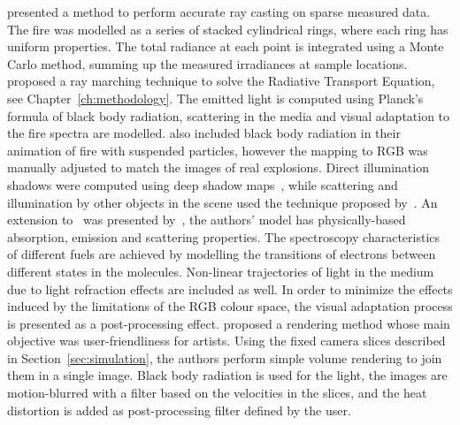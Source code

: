 \cite{Rushmeier:1995} presented a method to perform accurate ray casting on sparse measured data.
The fire was modelled as a series of stacked cylindrical rings, where each ring has uniform properties.
The total radiance at each point is integrated using a Monte Carlo method, summing up the measured irradiances at sample locations. 
\cite{Nguyen:2002} proposed a ray marching technique to solve the Radiative Transport Equation, see Chapter~\ref{ch:methodology}.
The emitted light is computed using Planck's formula of black body radiation, scattering in the media and visual adaptation to the fire spectra are modelled.
\cite{Feldman:2003} also included black body radiation in their animation of fire with suspended particles, however the mapping to RGB was manually adjusted to match the images of real explosions.
Direct illumination shadows were computed using deep shadow maps~\cite{Lokovic:2000}, while scattering and illumination by other objects in the scene used the technique proposed by~\cite{Jensen:2002}.
An extension to~\cite{Nguyen:2002} was presented by~\cite{Pegoraro:2006}, the authors' model has physically-based absorption, emission and scattering properties.
The spectroscopy characteristics of different fuels are achieved by modelling the transitions of electrons between different states in the molecules.
Non-linear trajectories of light in the medium due to light refraction effects are included as well.
In order to minimize the effects induced by the limitations of the RGB colour space, the visual adaptation process is presented as a post-processing effect.
\cite{Horvath:2009} proposed a rendering method whose main objective was user-friendliness for artists.
Using the fixed camera slices described in Section~\ref{sec:simulation}, the authors perform simple volume rendering to join them in a single image.
Black body radiation is used for the light, the images are motion-blurred with a filter based on the velocities in the slices, and the heat distortion is added as post-processing filter defined by the user. 